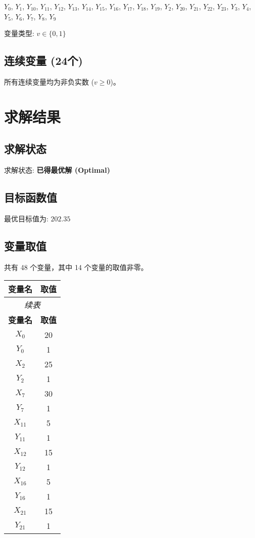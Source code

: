 \documentclass[a4paper,10pt]{article}
\begin{document}
{\small $Y_{0}$, $Y_{1}$, $Y_{10}$, $Y_{11}$, $Y_{12}$, $Y_{13}$, $Y_{14}$, $Y_{15}$, $Y_{16}$, $Y_{17}$, $Y_{18}$, $Y_{19}$, $Y_{2}$, $Y_{20}$, $Y_{21}$, $Y_{22}$, $Y_{23}$, $Y_{3}$, $Y_{4}$, $Y_{5}$, $Y_{6}$, $Y_{7}$, $Y_{8}$, $Y_{9}$}

变量类型: $v \in \{0,1\}$

\subsection{连续变量 (24个)}

所有连续变量均为非负实数 ($v \geq 0$)。

\section{求解结果}

\subsection{求解状态}

求解状态: \textbf{已得最优解 (Optimal)}

\subsection{目标函数值}

最优目标值为: $\mathbf{202.35}$

\subsection{变量取值}

共有 48 个变量，其中 14 个变量的取值非零。

\begin{center}
\begin{longtable}{cc}
\toprule
\textbf{变量名} & \textbf{取值} \\
\midrule
\endfirsthead
\multicolumn{2}{c}{\textit{续表}} \\
\toprule
\textbf{变量名} & \textbf{取值} \\
\midrule
\endhead
\bottomrule
\endfoot
\bottomrule
\endlastfoot
$X_{0}$ & 20 \\
$Y_{0}$ & 1 \\
$X_{2}$ & 25 \\
$Y_{2}$ & 1 \\
$X_{7}$ & 30 \\
$Y_{7}$ & 1 \\
$X_{11}$ & 5 \\
$Y_{11}$ & 1 \\
$X_{12}$ & 15 \\
$Y_{12}$ & 1 \\
$X_{16}$ & 5 \\
$Y_{16}$ & 1 \\
$X_{21}$ & 15 \\
$Y_{21}$ & 1 \\
\end{longtable}
\end{center}
\end{document}
